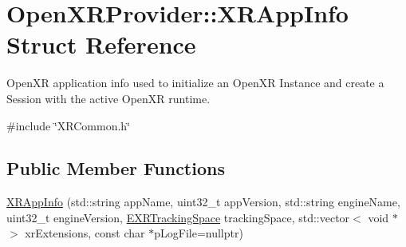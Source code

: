 \hypertarget{struct_open_x_r_provider_1_1_x_r_app_info}{}\section{Open\+X\+R\+Provider\+::X\+R\+App\+Info Struct Reference}
\label{struct_open_x_r_provider_1_1_x_r_app_info}


Open\+XR application info used to initialize an Open\+XR Instance and create a Session with the active Open\+XR runtime.  




{\ttfamily \#include \char`\"{}X\+R\+Common.\+h\char`\"{}}

\subsection*{Public Member Functions}
\begin{DoxyCompactItemize}
\item 
\mbox{\hyperlink{struct_open_x_r_provider_1_1_x_r_app_info_ac9fbe9b0ce705d53bd0907fa997efdce}{X\+R\+App\+Info}} (std\+::string app\+Name, uint32\+\_\+t app\+Version, std\+::string engine\+Name, uint32\+\_\+t engine\+Version, \mbox{\hyperlink{namespace_open_x_r_provider_a005dd91723b05b123b8fccbc41798b05}{E\+X\+R\+Tracking\+Space}} tracking\+Space, std\+::vector$<$ void $\ast$ $>$ xr\+Extensions, const char $\ast$p\+Log\+File=nullptr)
\end{DoxyCompactItemize}
